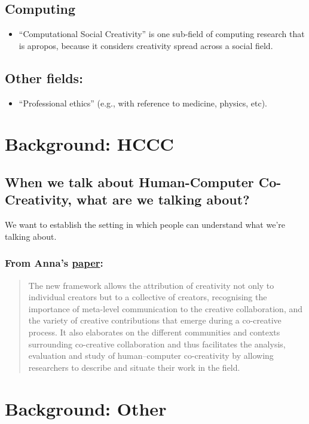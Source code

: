 \documentclass[11pt]{article}
\begin{document}
\subsection{Computing}
\label{sec:orgf4096d0}
\begin{itemize}
\item “Computational Social Creativity” is one sub-field of computing research that is apropos, because it considers creativity spread across a social field.
\end{itemize}
\subsection{Other fields:}
\label{sec:org569dc83}
\begin{itemize}
\item “Professional ethics” (e.g., with reference to medicine, physics, etc).
\end{itemize}

\section{Background: HCCC}
\label{sec:org2aca6e0}
\subsection{When we talk about Human-Computer Co-Creativity, what are we talking about?}
\label{sec:org36c0d13}
We want to establish the setting in which people can understand what we’re talking about.
\subsubsection{From Anna's \href{https://research.aalto.fi/en/publications/five-cs-for-humancomputer-co-creativity-an-update-on-classical-cr}{paper}:}
\label{sec:org14065b5}
\begin{quote}
The new framework allows the attribution of creativity not only to individual creators but to a collective of creators, recognising the importance of meta-level communication to the creative collaboration, and the variety of creative contributions that emerge during a co-creative process. It also elaborates on the different communities and contexts surrounding co-creative collaboration and thus facilitates the analysis, evaluation and study of human–computer co-creativity by allowing researchers to describe and situate their work in the field.
\end{quote}

\section{Background: Other}
\label{sec:orgaefd206}
\end{document}
